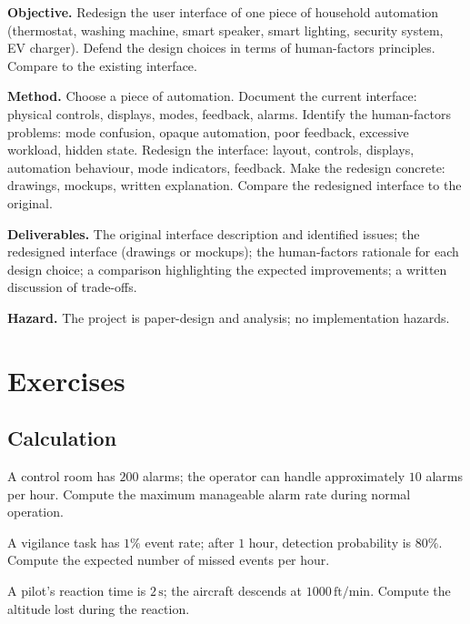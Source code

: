 \begin{project}
\textbf{Objective.} Redesign the user interface of one piece of household automation (thermostat, washing machine, smart speaker, smart lighting, security system, EV charger). Defend the design choices in terms of human-factors principles. Compare to the existing interface.

\textbf{Method.} Choose a piece of automation. Document the current interface: physical controls, displays, modes, feedback, alarms. Identify the human-factors problems: mode confusion, opaque automation, poor feedback, excessive workload, hidden state. Redesign the interface: layout, controls, displays, automation behaviour, mode indicators, feedback. Make the redesign concrete: drawings, mockups, written explanation. Compare the redesigned interface to the original.

\textbf{Deliverables.} The original interface description and identified issues; the redesigned interface (drawings or mockups); the human-factors rationale for each design choice; a comparison highlighting the expected improvements; a written discussion of trade-offs.

\textbf{Hazard.} The project is paper-design and analysis; no implementation hazards.
\end{project}

\section{Exercises}

\subsection*{Calculation}

\begin{exercise}
A control room has $200$ alarms; the operator can handle approximately $10$ alarms per hour. Compute the maximum manageable alarm rate during normal operation.
\end{exercise}

\begin{exercise}
A vigilance task has $1\%$ event rate; after $1$ hour, detection probability is $80\%$. Compute the expected number of missed events per hour.
\end{exercise}

\begin{exercise}
A pilot's reaction time is $2\,\text{s}$; the aircraft descends at $1000\,\text{ft/min}$. Compute the altitude lost during the reaction.
\end{exercise}

